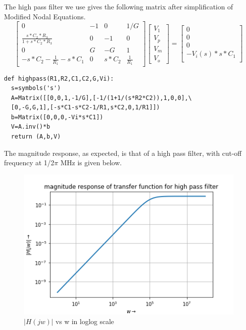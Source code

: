 \documentclass[11pt, a4paper]{article}
\begin{document}
The high pass filter we use gives the following matrix after simplification of Modified Nodal Equations.
\newline
\[
\begin{bmatrix}
    0   & -1 & 0  & 1/G \\
    \frac{s*C_2*R_3}{1+s*C_2*R_3}  & 0 & -1 & 0\\
    0  & G & -G & 1 \\
    -s*C_2 - \frac{1}{R_1} - s*C_1 & 0 & s*C_2 & \frac{1}{R_1}
\end{bmatrix}
\begin{bmatrix}
    V_1\\
    V_p\\
    V_m \\
    V_o
\end{bmatrix}
=
\begin{bmatrix}
    0 \\
    0 \\
    0 \\
    -V_i(s)*s*C_1 \\
    
\end{bmatrix}\]
\begin{verbatim}
def highpass(R1,R2,C1,C2,G,Vi):
  s=symbols('s')
  A=Matrix([[0,0,1,-1/G],[-1/(1+1/(s*R2*C2)),1,0,0],\
  [0,-G,G,1],[-s*C1-s*C2-1/R1,s*C2,0,1/R1]])
  b=Matrix([0,0,0,-Vi*s*C1])
  V=A.inv()*b
  return (A,b,V)
\end{verbatim}
The magnitude response, as expected, is that of a high pass filter, with
cut-off frequency at 1/2$\pi$ MHz is given below.
\begin{figure}[!tbh]
   	\centering
   	\includegraphics[scale=0.7]{mag_response.png}  %
   	\caption{$|H(jw)|$ vs w in loglog scale}
   	\label{fig:sample}
   \end{figure}
\end{document}
